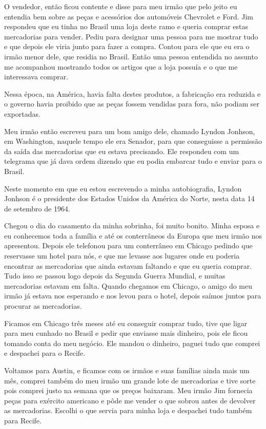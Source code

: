 O vendedor, então ficou contente e disse para meu irmão que pelo jeito
eu entendia bem sobre as peças e acessórios dos automóveis Chevrolet e
Ford. Jim respondeu que eu tinha no Brasil uma loja deste ramo e queria
comprar estas mercadorias para vender. Pediu para designar uma pessoa
para me mostrar tudo e que depois ele viria junto para fazer a compra.
Contou para ele que eu era o irmão menor dele, que residia no Brasil.
Então uma pessoa entendida no assunto me acompanhou mostrando todos os
artigos que a loja possuía e o que me interessava comprar.

Nessa época, na América, havia falta destes produtos, a fabricação era
reduzida e o governo havia proibido que as peças fossem vendidas para
fora, não podiam ser exportadas.

Meu irmão então escreveu para um bom amigo dele, chamado Lyndon Jonhson,
em Washington, naquele tempo ele era Senador, para que conseguisse a
permissão da saída das mercadorias que eu estava precisando. Ele
respondeu com um telegrama que já dava ordem dizendo que eu podia
embarcar tudo e enviar para o Brasil.

Neste momento em que eu estou escrevendo a minha autobiografia, Lyndon
Jonhson é o presidente dos Estados Unidos da América do Norte, nesta
data 14 de setembro de 1964.

Chegou o dia do casamento da minha sobrinha, foi muito bonito. Minha
esposa e eu conhecemos toda a família e até os conterrâneos da Europa
que meu irmão nos apresentou. Depois ele telefonou para um conterrâneo
em Chicago pedindo que reservasse um hotel para nós, e que me levasse
aos lugares onde eu poderia encontrar as mercadorias que ainda estavam
faltando e que eu queria comprar. Tudo isso se passou logo depois da
Segunda Guerra Mundial, e muitas mercadorias estavam em falta. Quando
chegamos em Chicago, o amigo do meu irmão já estava nos esperando e nos
levou para o hotel, depois saímos juntos para procurar as mercadorias.

Ficamos em Chicago três meses até eu conseguir comprar tudo, tive que
ligar para meu cunhado no Brasil e pedir que enviasse mais dinheiro,
pois ele ficou tomando conta do meu negócio. Ele mandou o dinheiro,
paguei tudo que comprei e despachei para o Recife.

Voltamos para Austin, e ficamos com os irmãos e suas famílias ainda mais
um mês, comprei também do meu irmão um grande lote de mercadorias e tive
sorte pois comprei justo na semana que os preços baixaram. Meu irmão Jim
fornecia peças para exército americano e pôde me vender o que sobrou
antes de devolver as mercadorias. Escolhi o que servia para minha loja e
despachei tudo também para Recife.

